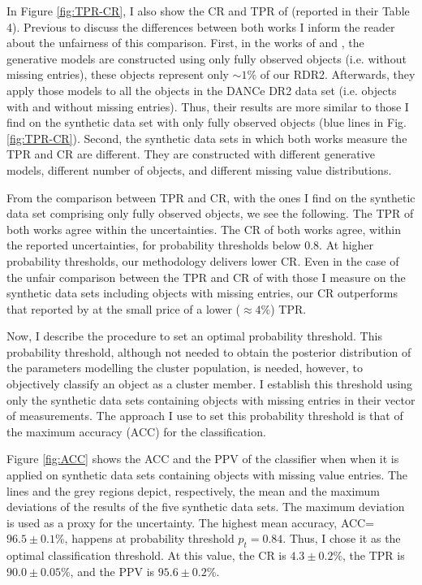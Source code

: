 In Figure \ref{fig:TPR-CR}, I also show the CR and TPR of \citet{Sarro2014} (reported in their Table 4). Previous to discuss the differences between both works I inform the reader about the unfairness of this comparison. First, in the works of \citet{Sarro2014} and \citet{Bouy2015}, the generative models are constructed using only fully observed objects (i.e. without missing entries), these objects represent only  $\sim 1\%$ of our RDR2. Afterwards, they apply those models to all the objects in the DANCe DR2 data set (i.e. objects with and without missing entries). Thus, their results are more similar to those I find on the synthetic data set with only fully observed objects (blue lines in Fig. \ref{fig:TPR-CR}). Second, the synthetic data sets in which both works measure the TPR and CR are different. They are constructed with different generative models, different number of objects, and different missing value distributions.

From the comparison between \citet{Sarro2014} TPR and CR, with the ones I find on the synthetic data set comprising only fully observed objects, we see the following. The TPR of both works agree within the uncertainties. The CR of both works agree, within the reported uncertainties, for probability thresholds below 0.8. At higher probability thresholds, our methodology delivers lower CR. Even in the case of the unfair comparison between the TPR and CR of \citet{Sarro2014} with those I measure on the synthetic data sets including objects with missing entries, our CR outperforms that reported by \citet{Sarro2014} at the small price of a lower ($\approx 4\%$) TPR.

Now, I describe the procedure to set an optimal probability threshold. This probability threshold, although not needed to obtain the posterior distribution of the parameters modelling the cluster population, is needed, however, to objectively classify an object as a cluster member. I establish this threshold using only the synthetic data sets containing objects with missing entries in their vector of measurements.  The approach I use to set this probability threshold is that of the maximum accuracy (ACC) for the classification. 

Figure \ref{fig:ACC} shows the ACC and the PPV of the classifier when when it is applied on synthetic data sets containing objects with missing value entries. The lines and the grey regions depict, respectively, the mean and the maximum deviations of the results of the five synthetic data sets. The maximum deviation is used as a proxy for the uncertainty. The highest mean accuracy, ACC=$96.5\pm0.1$\%, happens at probability threshold $p_t = 0.84$. Thus, I chose it as the optimal classification threshold. At this value, the CR is $4.3\pm0.2$\%, the TPR is $90.0\pm0.05$\%, and the PPV is $95.6\pm0.2$\%. 

